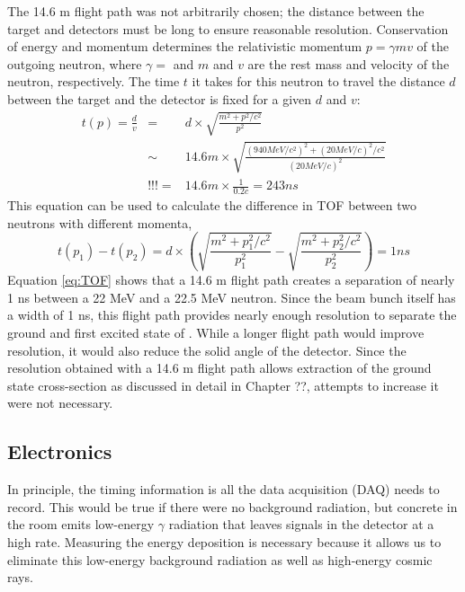 The 14.6 m flight path was not arbitrarily chosen; the distance between the target and detectors must be long to ensure reasonable resolution.  Conservation of energy and momentum determines the relativistic momentum $p = \gamma m v$ of the outgoing neutron, where $\gamma=$ and $m$ and $v$ are the rest mass and velocity of the neutron, respectively.  The time $t$ it takes for this neutron to travel the distance $d$ between the target and the detector is fixed for a given $d$ and $v$:
\begin{eqnarray}
t(p) = \frac{d}{v} &=&  d\times\sqrt{\frac{m^2+p^2/c^2}{p^2}} \\ 
                   &\sim& 14.6 m\times\sqrt{\frac{(940 MeV/c^2)^2+(20 MeV/c)^2/c^2}{(20 MeV/c)^2}} \nonumber \\
                   &!!!=& 14.6 m\times\frac{1}{0.2 c} = 243 ns \nonumber 
\end{eqnarray}
This equation can be used to calculate the difference in TOF between two neutrons with different momenta,
\begin{equation}
t(p_1) - t(p_2) = d\times(\sqrt{\frac{m^2+p_1^2/c^2}{p_1^2}}-\sqrt{\frac{m^2+p_2^2/c^2}{p_2^2}}) = 1 ns
\label{eq:TOF}
\end{equation}
Equation \ref{eq:TOF} shows that a 14.6 m flight path creates a separation of nearly 1 ns between a 22 MeV and a 22.5 MeV neutron.  Since the beam bunch itself has a width of 1 ns, this flight path provides nearly enough resolution to separate the ground and first excited state of \GeTargets. While a longer flight path would improve resolution, it would also reduce the solid angle of the detector.  Since the resolution obtained with a 14.6 m flight path allows extraction of the ground state cross-section as discussed in detail in Chapter ??, attempts to increase it were not necessary.


\subsection{Electronics}

In principle, the timing information is all the data acquisition (DAQ) needs to record.  This would be true if there were no background radiation, but concrete in the room emits low-energy $\gamma$ radiation that leaves signals in the detector at a high rate.  Measuring the energy deposition is necessary because it allows us to eliminate this low-energy background radiation as well as high-energy cosmic rays.

